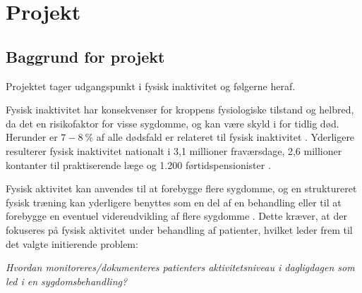 \chapter{Projekt}
\section{Baggrund for projekt}
Projektet tager udgangspunkt i fysisk inaktivitet og følgerne heraf. 

Fysisk inaktivitet har konsekvenser for kroppens fysiologiske tilstand og helbred, da det en risikofaktor for visse sygdomme, og kan være skyld i for tidlig død. Herunder er $7-8~\%$ af alle dødsfald er relateret til fysisk inaktivitet \citep{aagaard2014,motionsraad2007}.  
Yderligere resulterer fysisk inaktivitet nationalt i 3,1 millioner fraværsdage, 2,6 millioner kontanter til praktiserende læge og 1.200 førtidspensionister \citep{christensen2012}. 

Fysisk aktivitet kan anvendes til at forebygge flere sygdomme, og en struktureret fysisk træning kan yderligere benyttes som en del af en behandling eller til at forebygge en eventuel videreudvikling af flere sygdomme \citep{motionsraad2007}. Dette kræver, at der fokuseres på fysisk aktivitet under behandling af patienter, hvilket leder frem til det valgte initierende problem:

\noindent
\begin{center}
\textit{Hvordan monitoreres/dokumenteres patienters aktivitetsniveau i dagligdagen som led i en sygdomsbehandling?}  
\end{center}
